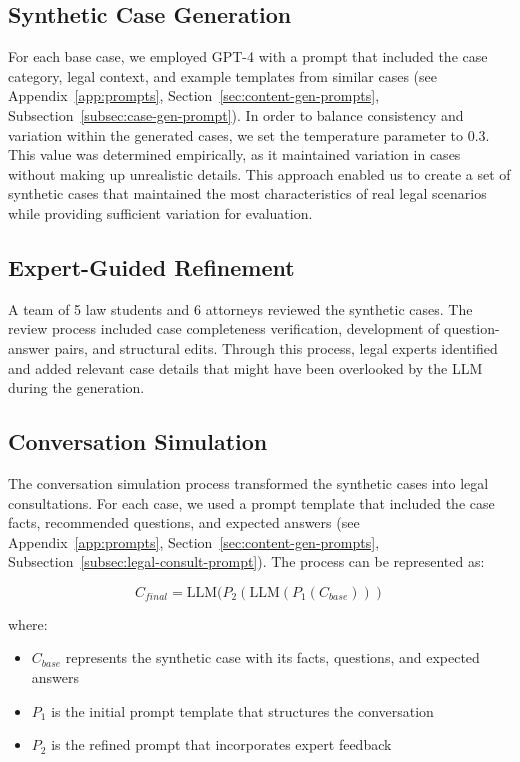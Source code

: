 \subsection{Synthetic Case Generation}
For each base case, we employed GPT-4 with a prompt that included the case category, legal context, 
and example templates from similar cases (see Appendix~\ref{app:prompts}, Section~\ref{sec:content-gen-prompts}, 
Subsection~\ref{subsec:case-gen-prompt}). 
In order to balance consistency and variation within the generated cases, we set the temperature parameter to 0.3. This value was determined empirically, as it maintained variation in cases without making up unrealistic details. This approach enabled us to create a set of synthetic cases that maintained the most characteristics of real legal scenarios while providing sufficient variation for evaluation.

\subsection{Expert-Guided Refinement}
A team of 5 law students and 6 attorneys reviewed the synthetic cases. The review process included case completeness verification, 
development of question-answer pairs, and structural edits. Through this process, legal experts identified and 
added relevant case details that might have been overlooked by the LLM during the generation.

\subsection{Conversation Simulation}
The conversation simulation process transformed the synthetic cases into legal consultations. For each case, 
we used a prompt template that included the case facts, recommended questions, and expected answers
(see Appendix~\ref{app:prompts}, Section~\ref{sec:content-gen-prompts}, 
Subsection~\ref{subsec:legal-consult-prompt}). 
The process can be represented as:

\begin{equation}
    C_{final} = \text{LLM}(P_2(\text{LLM}(P_1(C_{base})))
\end{equation}

where:
\begin{itemize}
    \item $C_{base}$ represents the synthetic case with its facts, questions, and expected answers
    \item $P_1$ is the initial prompt template that structures the conversation
    \item $P_2$ is the refined prompt that incorporates expert feedback
\end{itemize}

